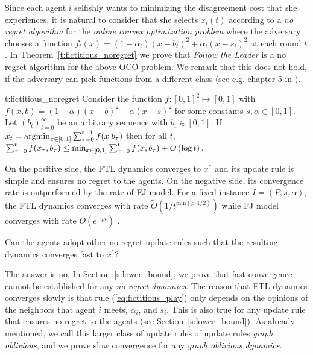 Since each agent $i$ selfishly wants to minimizing the disagreement cost
that she experiences, it is natural to consider that she selects $x_i(t)$ according to
a \emph{no regret algorithm} for the \emph{online convex optimization problem}
where the adversary chooses a function $f_t(x)=(1-\alpha_i)(x-b_t)^2 + \alpha_i(x-s_i)^2$
at each round $t$. In Theorem~\ref{t:fictitious_noregret}
we prove that \emph{Follow the Leader} is a no regret algorithm
for the above OCO problem. We remark that this does not hold,
if the adversary can pick functions from a different class
(see e.g. chapter 5 in \cite{Haz16}).

\begin{reptheorem}{t:fictitious_noregret}
  Consider the function $f:[0,1]^2 \mapsto [0,1]$ with
  $f(x,b) = (1-\alpha)(x-b)^2 + \alpha(x-s)^2$ for some
  constants $s,\alpha \in [0,1]$.
  Let $(b_t)_{t=0}^\infty$ be an arbitrary sequence with
  $b_t \in [0,1]$. If $x_t = \operatorname*{argmin}_{x \in [0,1]}\sum_{\tau=0}^{t-1}f(x_,b_\tau)$
  then for all $t$,
  \(
    \sum_{\tau=0}^{t}f(x_\tau,b_\tau) \leq
    \min_{x \in [0,1]}\sum_{\tau=0}^tf(x,b_\tau) + O\left(\log t\right).
  \)
\end{reptheorem}

On the positive side, the FTL dynamics converges to $x^*$ and its
update rule is simple and ensures no regret to the agents.
On the negative side, its convergence rate is outperformed by the rate of FJ
model.  For a fixed instance $I=(P,s,\alpha)$, the FTL dynamics converges with
rate $\widetilde{O}(1/t^{\text{min}(\rho,1/2)})$ while FJ model
converges with rate $O(e^{-\rho t})$ \cite{GS14}.

\begin{question}
  Can the agents adopt other no regret update rules such that the resulting
  dynamics converges fast to $x^*$?
\end{question}

The answer is no. In Section~\ref{s:lower_bound}, we prove that fast convergence cannot be established 
for any \emph{no regret dynamics}.
The reason that FTL dynamics converges slowly is that
 rule (\ref{eq:fictitious_play})
only depends on the opinions of the neighbors that agent $i$ meets,
$\alpha_i$, and $s_i$. This is also true for any update rule that
ensures no regret to the agents (see Section~\ref{s:lower_bound}).
As already mentioned, we call this larger class of update rules
of update rules \emph{graph oblivious}, and we prove slow convergence
for any \emph{graph oblivious dynamics}.

